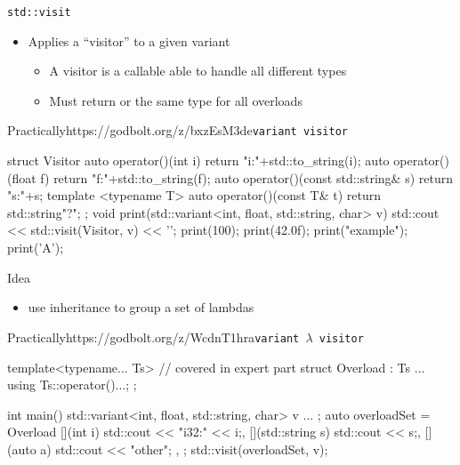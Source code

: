 \begin{frame}[fragile]
  \begin{block}{\texttt{std::visit} }
    \begin{itemize}
      \item Applies a ``visitor'' to a given variant
      \begin{itemize}
        \item A visitor is a callable able to handle all different types
        \item Must return  or the same type for all overloads
      \end{itemize}
    \end{itemize}
  \end{block}
  \begin{exampleblockGB}{Practically}{https://godbolt.org/z/bxzEsM3de}{\texttt{variant visitor}}
    \small
    \begin{cppcode*}{}
      struct Visitor {
        auto operator()(int i)   {return "i:"+std::to_string(i);}
        auto operator()(float f) {return "f:"+std::to_string(f);}
        auto operator()(const std::string& s) { return "s:"+s;}
        template <typename T>
        auto operator()(const T& t) { return std::string{"?"}; }
      };
      void print(std::variant<int, float, std::string, char> v) {
        std::cout << std::visit(Visitor{}, v) << '\n';
      }
      print(100); print(42.0f); print("example"); print('A');
    \end{cppcode*}
  \end{exampleblockGB}
\end{frame}

\begin{frame}[fragile]
  \begin{block}{Idea}
    \begin{itemize}
    \item use inheritance to group a set of lambdas
    \end{itemize}
  \end{block}
  \begin{exampleblockGB}{Practically}{https://godbolt.org/z/WcdnT1hra}{\texttt{variant $\lambda$ visitor}}
    \small
    \begin{cppcode*}{}
      template<typename... Ts> // covered in expert part
      struct Overload : Ts ... { using Ts::operator()...; };

      int main(){
        std::variant<int, float, std::string, char> v{ ... };
        auto overloadSet = Overload {
          [](int i) { std::cout << "i32:" << i;},
          [](std::string s) { std::cout << s;},
          [](auto a) { std::cout << "other"; },
        };
        std::visit(overloadSet, v);
      }
    \end{cppcode*}
  \end{exampleblockGB}
\end{frame}

